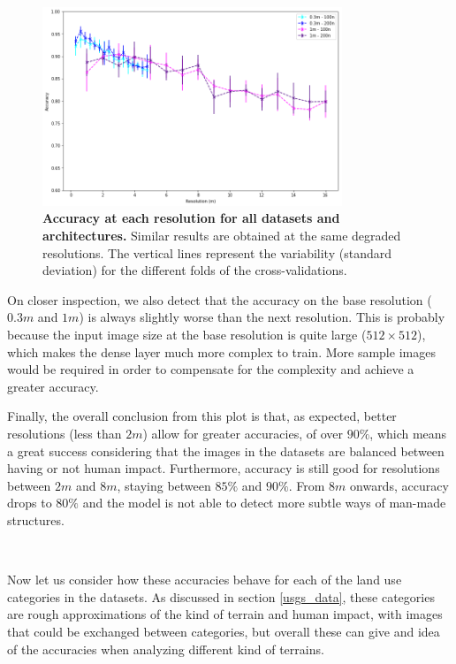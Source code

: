 \begin{figure}[h!]
	\centering
	\includegraphics[width=0.8\textwidth]{Figures/results/acc_res_03m_1m.png}
	\captionsetup{width=1\linewidth}
	\caption{\textbf{Accuracy at each resolution for all datasets and architectures.} Similar results are obtained at the same degraded resolutions. The vertical lines represent the variability (standard deviation) for the different folds of the cross-validations.}
	\label{fig:acc_res_03m_1m}
\end{figure}

On closer inspection, we also detect that the accuracy on the base resolution ($0.3m$ and $1m$) is always slightly worse than the next resolution. This is probably because the input image size at the base resolution is quite large ($512\times512$), which makes the dense layer much more complex to train. More sample images would be required in order to compensate for the complexity and achieve a greater accuracy.

Finally, the overall conclusion from this plot is that, as expected, better resolutions (less than $2m$) allow for greater accuracies, of over $90\%$, which means a great success considering that the images in the datasets are balanced between having or not human impact. Furthermore, accuracy is still good for resolutions between $2m$ and $8m$, staying between $85\%$ and $90\%$. From $8m$ onwards, accuracy drops to $80\%$ and the model is not able to detect more subtle ways of man-made structures.

\

Now let us consider how these accuracies behave for each of the land use categories in the datasets. As discussed in section \ref{usgs_data}, these categories are rough approximations of the kind of terrain and human impact, with images that could be exchanged between categories, but overall these can give and idea of the accuracies when analyzing different kind of terrains. 


